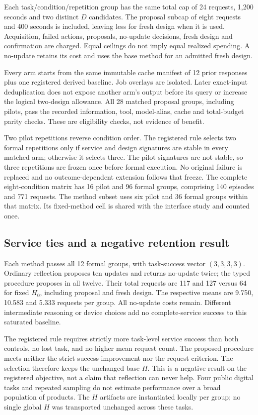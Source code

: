 Each task/condition/repetition group has the same total cap of 24 requests,
1,200 seconds and two distinct $D$ candidates. The proposal subcap of eight
requests and 400 seconds is included, leaving less for fresh design when it
is used. Acquisition, failed actions, proposals, no-update decisions, fresh
design and confirmation are charged. Equal ceilings do not imply equal
realized spending. A no-update retains its cost and uses the base method for
an admitted fresh design.

Every arm starts from the same immutable cache manifest of 12 prior responses
plus one registered derived baseline. Job overlays are isolated. Later exact-input
deduplication does not expose another arm's output before its query or increase
the logical two-design allowance. All 28 matched proposal groups, including
pilots, pass the recorded information, tool, model-alias, cache and total-budget
parity checks. These are eligibility checks, not evidence of benefit.

Two pilot repetitions reverse condition order. The registered rule selects two
formal repetitions only if service and design signatures are stable in every
matched arm; otherwise it selects three. The pilot signatures are not stable,
so three repetitions are frozen once before formal execution. No original
failure is replaced and no outcome-dependent extension follows that freeze.
The complete eight-condition matrix has 16 pilot and 96 formal groups, comprising
140 episodes and 771 requests. The method subset uses six pilot and 36 formal
groups within that matrix. Its fixed-method cell is shared with the interface
study and counted once.

\subsection{Service ties and a negative retention result}

Each method passes all 12 formal groups, with task-success vector $(3,3,3,3)$.
Ordinary reflection proposes ten updates and returns no-update twice; the typed
procedure proposes in all twelve. Their total requests are 117 and 127 versus
64 for fixed $H_0$, including proposal and fresh design. The respective means
are 9.750, 10.583 and 5.333 requests per group. All no-update costs remain.
Different intermediate reasoning or device choices add no complete-service
success to this saturated baseline.

The registered rule requires strictly more task-level service success than
both controls, no lost task, and no higher mean request count. The proposed
procedure meets neither the strict success improvement nor the request criterion.
The selection therefore keeps the unchanged base $H$. This is a negative
result on the registered objective, not a claim that reflection can never help.
Four public digital tasks and repeated sampling do not estimate performance
over a broad population of products. The $H$ artifacts are instantiated locally
per group; no single global $H$ was transported unchanged across these tasks.

